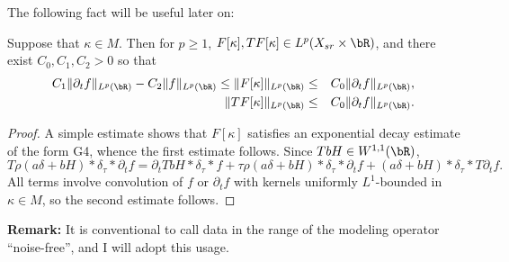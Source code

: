 The following fact will be useful later on:

\begin{prop}
  \label{thm:noisefree}
  Suppose that $\kappa \in M$. Then for $p \ge 1$, $F[\kappa], TF[\kappa]
  \in L^p(X_{sr} \times \bR)$, and there exist $C_0, C_1, C_2 >0$ so that
  \begin{eqnarray}
    \label{eqn:dnorms}
    C_1\|\partial_tf\|_{L^p(\bR)} - C_2\|f\|_{L^p(\bR)} \le \|F[\kappa]\|_{L^p(\bR)} & \le & C_0\|\partial_tf\|_{L^p(\bR)}, \nonumber \\
    \|TF[\kappa]\|_{L^p(\bR)} & \le & C_0\|\partial_tf\|_{L^p(\bR)}.
  \end{eqnarray}
\end{prop}

\begin{proof}
  A simple estimate shows that $F[\kappa]$ satisfies an exponential
  decay estimate of the form G4, whence the first estimate
  follows. Since $TbH \in W^{1,1}(\bR)$,
  \[
    T\rho(a\delta + bH)*\delta_{\tau}*\partial_t f = \partial_t TbH *
    \delta_{\tau} * f + \tau \rho (a\delta +
    bH)*\delta_{\tau}*\partial_t f  + (a\delta +
    bH)*\delta_{\tau}*T\partial_t f.
  \]
  All terms involve convolution of $f$ or $\partial_t f$ with kernels
  uniformly $L^1$-bounded in $\kappa \in M$, so the second estimate follows. 
\end{proof}

{\bf Remark:} It is conventional to call data in the range of the
modeling operator ``noise-free'', and I will adopt this usage.

